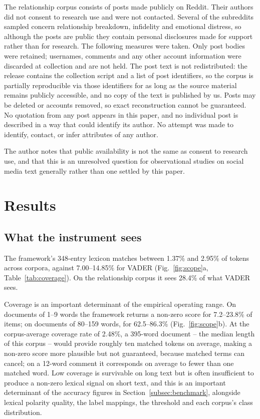 \documentclass[fleqn,10pt]{wlscirep}
\begin{document}
The relationship corpus consists of posts made publicly on Reddit. Their authors
did not consent to research use and were not contacted. Several of the
subreddits sampled concern relationship breakdown, infidelity and emotional
distress, so although the posts are public they contain personal disclosures
made for support rather than for research. The following measures were taken.
Only post bodies were retained; usernames, comments and any other account
information were discarded at collection and are not held. The post text is not
redistributed: the release contains the collection script and a list of post
identifiers, so the corpus is partially reproducible via those identifiers for as long as the source material remains publicly accessible, and no copy of the text is published by us. Posts may be deleted or accounts removed, so exact reconstruction cannot be guaranteed. No quotation from any post appears in this paper, and no
individual post is described in a way that could identify its author. No attempt
was made to identify, contact, or infer attributes of any author.

The author notes that public availability is not the same as consent to
research use, and that this is an unresolved question for observational studies
on social media text generally rather than one settled by this paper.

\section{Results}\label{sec:results}

\subsection{What the instrument sees}\label{subsec:coverage}

The framework's 348-entry lexicon matches between 1.37\% and 2.95\% of tokens across corpora, against 7.00--14.85\% for VADER (Fig.~\ref{fig:scope}a, Table~\ref{tab:coverage}). On the relationship corpus it sees 28.4\% of what VADER sees.

Coverage is an important determinant of the empirical operating range. On documents of 1--9 words the framework returns a non-zero score for 7.2--23.8\% of items; on documents of 80--159 words, for 62.5--86.3\% (Fig.~\ref{fig:scope}b). At the corpus-average coverage rate of 2.48\%, a 395-word document -- the median length of this corpus -- would provide roughly ten matched tokens on average, making a non-zero score more plausible but not guaranteed, because matched terms can cancel; on a 12-word comment it corresponds on average to fewer than one matched word. Low coverage is survivable on long text but is often insufficient to produce a non-zero lexical signal on short text, and this is an important determinant of the accuracy figures in Section~\ref{subsec:benchmark}, alongside lexical polarity quality, the label mappings, the threshold and each corpus's class distribution.
\end{document}

